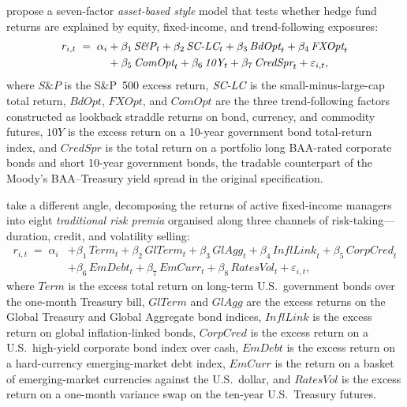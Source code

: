 \citet{fung2004hedge} propose a seven-factor \emph{asset-based style}
model that tests whether hedge fund returns are explained by equity,
fixed-income, and trend-following exposures:
\begin{equation}\label{eq:funghsieh}
\begin{split}
  r_{i,t} \;=\; \alpha_i
  &+ \beta_1\,\textit{S\&P}_t + \beta_2\,\textit{SC\text{-}LC}_t
   + \beta_3\,\textit{BdOpt}_t + \beta_4\,\textit{FXOpt}_t \\
  &+ \beta_5\,\textit{ComOpt}_t
   + \beta_6\,\textit{10Y}_t
   + \beta_7\,\textit{CredSpr}_t + \varepsilon_{i,t},
\end{split}
\end{equation}
where $\textit{S\&P}$ is the S\&P~500 excess return,
$\textit{SC\text{-}LC}$ is the small-minus-large-cap total return,
$\textit{BdOpt}$, $\textit{FXOpt}$, and $\textit{ComOpt}$ are the
three trend-following factors constructed as lookback straddle returns
on bond, currency, and commodity futures, $\textit{10Y}$ is the excess
return on a 10-year government bond total-return index, and
$\textit{CredSpr}$ is the total return on a portfolio long BAA-rated
corporate bonds and short 10-year government bonds, the tradable
counterpart of the Moody's BAA--Treasury yield spread in the original
specification.

\citet{brooks2020active} take a different angle, decomposing the
returns of active fixed-income managers into eight \emph{traditional
risk premia} organised along three channels of risk-taking---duration,
credit, and volatility selling:
\begin{equation}\label{eq:brooks}
\begin{split}
  r_{i,t} \;=\; \alpha_i
  &+ \beta_1\,\textit{Term}_t + \beta_2\,\textit{GlTerm}_t
   + \beta_3\,\textit{GlAgg}_t + \beta_4\,\textit{InflLink}_t 
   + \beta_5\,\textit{CorpCred}_t \\
  &+ \beta_6\,\textit{EmDebt}_t + \beta_7\,\textit{EmCurr}_t 
  + \beta_8\,\textit{RatesVol}_t + \varepsilon_{i,t},
\end{split}
\end{equation}
where $\textit{Term}$ is the excess total return on long-term U.S.\
government bonds over the one-month Treasury bill, $\textit{GlTerm}$
and $\textit{GlAgg}$ are the excess returns on the Global
Treasury and Global Aggregate bond indices, $\textit{InflLink}$ is the
excess return on global inflation-linked bonds, $\textit{CorpCred}$ is
the excess return on a U.S.\ high-yield corporate bond index over
cash, $\textit{EmDebt}$ is the excess return on a hard-currency
emerging-market debt index, $\textit{EmCurr}$ is the return on a
basket of emerging-market currencies against the U.S.\ dollar, and
$\textit{RatesVol}$ is the excess return on a one-month variance swap
on the ten-year U.S.\ Treasury futures.

